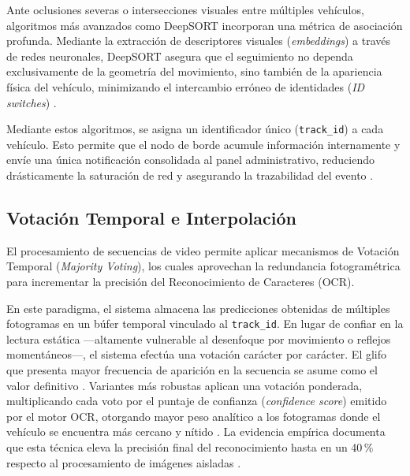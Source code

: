 Ante oclusiones severas o intersecciones visuales entre múltiples vehículos, algoritmos 
más avanzados como DeepSORT incorporan una métrica de asociación profunda. Mediante la 
extracción de descriptores visuales (\textit{embeddings}) a través de redes neuronales, 
DeepSORT asegura que el seguimiento no dependa exclusivamente de la geometría del 
movimiento, sino también de la apariencia física del vehículo, minimizando el 
intercambio erróneo de identidades (\textit{ID switches}) 
\parencite{ammarMultiStageDeepLearningBasedVehicle2023, mobeenRealTimeAutomaticLicense2026}.

Mediante estos algoritmos, se asigna un identificador único (\texttt{track\_id}) a 
cada vehículo. Esto permite que el nodo de borde acumule información internamente y 
envíe una única notificación consolidada al panel administrativo, reduciendo 
drásticamente la saturación de red y asegurando la trazabilidad del evento 
\parencite{ammarMultiStageDeepLearningBasedVehicle2023}.

\subsection{Votación Temporal e Interpolación}

El procesamiento de secuencias de video permite aplicar mecanismos de Votación Temporal 
(\textit{Majority Voting}), los cuales aprovechan la redundancia fotogramétrica para 
incrementar la precisión del Reconocimiento de Caracteres (OCR). 

En este paradigma, el sistema almacena las predicciones obtenidas de múltiples 
fotogramas en un búfer temporal vinculado al \texttt{track\_id}. En lugar de confiar 
en la lectura estática ---altamente vulnerable al desenfoque por movimiento o reflejos 
momentáneos---, el sistema efectúa una votación carácter por carácter. El glifo que 
presenta mayor frecuencia de aparición en la secuencia se asume como el valor definitivo 
\parencite{ammarMultiStageDeepLearningBasedVehicle2023}. Variantes más robustas aplican 
una votación ponderada, multiplicando cada voto por el puntaje de confianza (\textit{confidence score}) 
emitido por el motor OCR, otorgando mayor peso analítico a los fotogramas donde el 
vehículo se encuentra más cercano y nítido 
\parencite{ammarMultiStageDeepLearningBasedVehicle2023}. La evidencia empírica documenta que 
esta técnica eleva la precisión final del reconocimiento hasta en un 40\,\% respecto al 
procesamiento de imágenes aisladas \parencite{ammarMultiStageDeepLearningBasedVehicle2023, mobeenRealTimeAutomaticLicense2026}.

